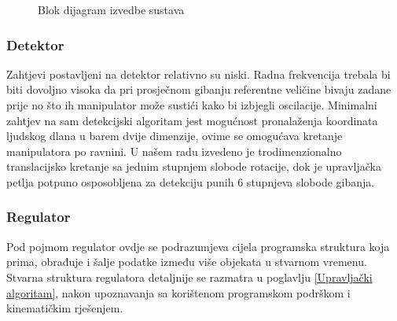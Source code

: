 \documentclass[times, utf8, diplomski, numeric]{fer}
\begin{document}
\begin{figure}[!h]
\centering
{}
\caption{Blok dijagram izvedbe sustava}\label{izvedba}
\end{figure}

\subsubsection{Detektor}
Zahtjevi postavljeni na detektor relativno su niski. 
Radna frekvencija trebala bi biti dovoljno visoka da pri prosječnom gibanju referentne veličine bivaju zadane prije no što ih manipulator može sustići kako bi izbjegli oscilacije.
Minimalni zahtjev na sam detekcijski algoritam jest mogućnost pronalaženja koordinata ljudskog dlana u barem dvije dimenzije, ovime se omogućava kretanje manipulatora po ravnini.
U našem radu izvedeno je trodimenzionalno translacijsko kretanje sa jednim stupnjem slobode rotacije, dok je upravljačka petlja potpuno osposobljena za detekciju punih 6 stupnjeva slobode gibanja.

\subsubsection{Regulator}
Pod pojmom regulator ovdje se podrazumjeva cijela programska struktura koja prima, obrađuje i šalje podatke između više objekata u stvarnom vremenu.
Stvarna struktura regulatora detaljnije se razmatra u poglavlju \ref{Upravljački algoritam}, nakon upoznavanja sa korištenom programskom podrškom i kinematičkim rješenjem.
\end{document}
